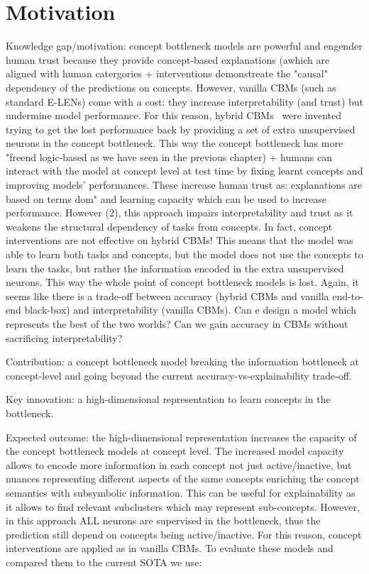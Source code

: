 \documentclass[withindex,glossary]{cam-thesis}
\theoremstyle{plain}
\theoremstyle{definition}
\theoremstyle{remark}
\begin{document}
\section{Motivation}
Knowledge gap/motivation: concept bottleneck models are powerful and engender human trust because they provide concept-based explanations (awhich are aligned with human catergories + interventions demonstreate the "causal" dependency of the predictions on concepts. However, vanilla CBMs (such as standard E-LENs) come with a cost: they increase interpretability (and trust) but undermine model performance. For this reason, hybrid CBMs~\citep{mahinpei2021promises} were invented trying to get the lost performance back by providing a set of extra unsupervised neurons in the concept bottleneck. This way the concept bottleneck has more "freend logic-based as we have seen in the previous chapter) + humans can interact with the model at concept level at test time by fixing learnt concepts and improving models' performances. These increase human trust as: explanations are based on terms dom" and learning capacity which can be used to increase performance. However (2), this approach impairs interpretability and trust as it weakens the structural dependency of tasks from concepts. In fact, concept interventions are not effective on hybrid CBMs! This means that the model was able to learn both tasks and concepts, but the model does not use the concepts to learn the tasks, but rather the information encoded in the extra unsupervised neurons. This way the whole point of concept bottleneck models is lost. Again, it seems like there is a trade-off between accuracy (hybrid CBMs and vanilla end-to-end black-box) and interpretability (vanilla CBMs). Can e design a model which represents the best of the two worlds? Can we gain accuracy in CBMs without sacrificing interpretability?


Contribution: a concept bottleneck model breaking the information bottleneck at concept-level and going beyond the current accuracy-vs-explainability trade-off.

Key innovation: a high-dimensional representation to learn concepts in the bottleneck.

Expected outcome: the high-dimensional representation increases the capacity of the concept bottleneck models at concept level. The increased model capacity allows to encode more information in each concept not just active/inactive, but nuances representing different aspects of the same concepts enriching the concept semantics with subsymbolic information. This can be useful for explainability as it allows to find relevant subclusters which may represent sub-concepts. However, in this approach ALL neurons are supervised in the bottleneck, thus the prediction still depend on concepts being active/inactive. For this reason, concept interventions are applied as in vanilla CBMs. To evaluate these models and compared them to the current SOTA we use:
\end{document}
